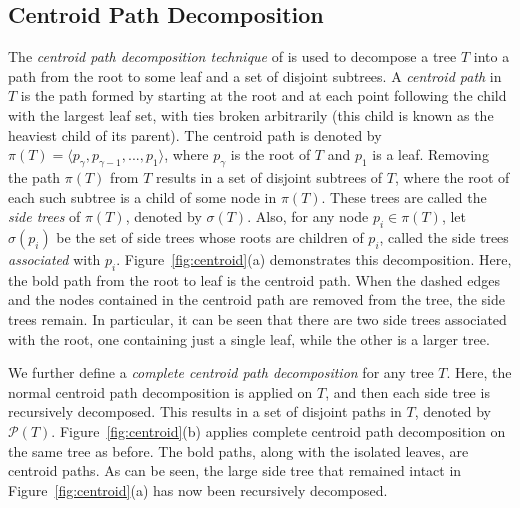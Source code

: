 \documentclass{article}
\begin{document}
    \subsection{Centroid Path Decomposition}

    The \textit{centroid path decomposition technique} of \cite{cole2000n} is used to decompose a tree $T$ into a path from the root to some leaf and a set of disjoint subtrees. A \textit{centroid path} in $T$ is the path formed by starting at the root and at each point following the child with the largest leaf set, with ties broken arbitrarily (this child is known as the heaviest child of its parent). The centroid path is denoted by $\pi(T) = \langle p_{\gamma}, p_{\gamma - 1}, ..., p_1 \rangle$, where $p_{\gamma}$ is the root of $T$ and $p_1$ is a leaf. Removing the path $\pi(T)$ from $T$ results in a set of disjoint subtrees of $T$, where the root of each such subtree is a child of some node in $\pi(T)$. These trees are called the \textit{side trees} of $\pi(T)$, denoted by $\sigma(T)$. Also, for any node $p_i \in \pi(T)$, let $\sigma(p_i)$ be the set of side trees whose roots are children of $p_i$, called the side trees \textit{associated} with $p_i$. Figure~\ref{fig:centroid}(a) demonstrates this decomposition. Here, the bold path from the root to leaf is the centroid path. When the dashed edges and the nodes contained in the centroid path are removed from the tree, the side trees remain. In particular, it can be seen that there are two side trees associated with the root, one containing just a single leaf, while the other is a larger tree.

    We further define a \textit{complete centroid path decomposition} for any tree $T$. Here, the normal centroid path decomposition is applied on $T$, and then each side tree is recursively decomposed. This results in a set of disjoint paths in $T$, denoted by $\mathcal{P}(T)$. Figure~\ref{fig:centroid}(b) applies complete centroid path decomposition on the same tree as before. The bold paths, along with the isolated leaves, are centroid paths. As can be seen, the large side tree that remained intact in Figure~\ref{fig:centroid}(a) has now been recursively decomposed.
\end{document}
